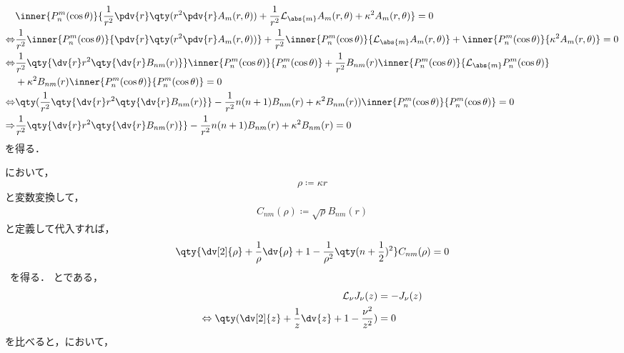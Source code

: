 \documentclass{report}
\begin{document}
      \begin{align}
        & \inner{P_n^{m}(\cos\theta)}{\frac{1}{r^2}\pdv{r}\qty(r^2\pdv{r}A_m(r, \theta)) + \frac{1}{r^2}\mathcal{L}_{\abs{m}}A_m(r, \theta) + \kappa^2 A_m(r, \theta)} = 0 \\ 
        \Leftrightarrow & \frac{1}{r^2}\inner{P_n^{m}(\cos\theta)}{\pdv{r}\qty(r^2\pdv{r}A_m(r, \theta))} + \frac{1}{r^2}\inner{P_n^{m}(\cos\theta)}{\mathcal{L}_{\abs{m}}A_m(r, \theta)} + \inner{P_n^{m}(\cos\theta)}{\kappa^2 A_m(r, \theta)} = 0 \\ 
        \Leftrightarrow & \frac{1}{r^2}\qty{\dv{r}r^2\qty{\dv{r}B_{nm}(r)}}\inner{P_n^{m}(\cos\theta)}{P_n^{m}(\cos\theta)} + \frac{1}{r^2}B_{nm}(r)\inner{P_n^{m}(\cos\theta)}{\mathcal{L}_{\abs{m}}P_n^{m}(\cos\theta)} \notag \\ 
        &+ \kappa^2B_{nm}(r)\inner{P_n^{m}(\cos\theta)}{P_n^{m}(\cos\theta)} = 0 \\ 
        \Leftrightarrow&  \qty(\frac{1}{r^2}\qty{\dv{r}r^2\qty{\dv{r}B_{nm}(r)}} - \frac{1}{r^2}n(n + 1)B_{nm}(r) + \kappa^2 B_{nm}(r))\inner{P_n^{m}(\cos\theta)}{P_n^{m}(\cos\theta)} = 0 \\ 
        \Rightarrow& \frac{1}{r^2}\qty{\dv{r}r^2\qty{\dv{r}B_{nm}(r)}} - \frac{1}{r^2}n(n + 1)B_{nm}(r) + \kappa^2 B_{nm}(r) = 0\label{bnm-condition}
      \end{align}
      を得る．
      \par
      において，
      \begin{align}
        \rho \coloneqq \kappa r\label{rho-def}
      \end{align}
      と変数変換して，
      \begin{align}
        C_{nm}(\rho) \coloneq \sqrt{\rho}B_{nm}(r)\label{cnm-def}
      \end{align}
      と定義して代入すれば，
      \begin{align}
        \qty{\dv[2]{\rho} + \frac{1}{\rho}\dv{\rho} + 1 - \frac{1}{\rho^2}\qty(n + \frac{1}{2})^2}C_{nm}(\rho) = 0\label{bessel-form-rho}
      \end{align}\
      を得る．
      とである，
      \begin{align}
        \mathcal{L}_{\nu}J_{\nu}(z) &= - J_{\nu}(z)  \\ 
        \Leftrightarrow \qty(\dv[2]{z} + \frac{1}{z}\dv{z} + 1 - \frac{\nu^2}{z^2}) &= 0 \label{bessel-differential-eq-sub-2}
      \end{align}
      を比べると，において，
\end{document}
